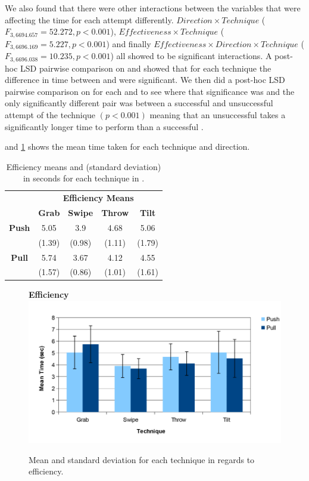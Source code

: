 We also found that there were other interactions between the variables that were affecting the time for each attempt differently. 
$Direction \times Technique$  ($F_{3,6694.657} = 52.272, p < 0.001$), $Effectiveness \times Technique$  ($F_{3,6696.169} = 5.227, p < 0.001$) and finally $Effectiveness \times Direction \times Technique$  ($F_{3,6696.038} = 10.235, p < 0.001$) all showed to be significant interactions. 
A post-hoc LSD pairwise comparison on \direction and \technique showed that for each technique the difference in time between \push and \pull were significant.
We then did a post-hoc LSD pairwise comparison on \effectiveness for each \technique and \direction to see where that significance was and the only significantly different pair was between a successful and unsuccessful attempt of the \grab \pull technique $(p < 0.001)$ meaning that an unsuccessful \grab \pull takes a significantly longer time to perform than a successful \grab \pull.

 and \cref{fig:efficiencyGraph} shows the mean time taken for each technique and direction.

\begin{table}[H]
	\centering
	\def\arraystretch{1}
		\begin{tabular}{c c c c c}
			& \multicolumn{4}{c}{\textbf{Efficiency Means}} \B \\
			\cline{2-5}
			& \textbf{Grab} & \textbf{Swipe} & \textbf{Throw} & \textbf{Tilt} \T\B \\ \hline
			\textbf{Push} & 5.05 & 3.9 & 4.68 & 5.06 \T \\ 
			& (1.39) & (0.98) & (1.11) & (1.79) \B \\ \hline
			\textbf{Pull} & 5.74 & 3.67 & 4.12 & 4.55 \T \\ 
			& (1.57) & (0.86) & (1.01) & (1.61) \B \\ \hline
		\end{tabular}
	\caption{Efficiency means and (standard deviation) in seconds for each technique in \target.}
	\label{tab:efficiency}
\end{table}

\begin{figure}[H]{
	\centering
	\textbf{Efficiency}\\[4pt]
	\includegraphics[width = 1\columnwidth ]{images/time_graph.pdf}} 
	\caption{
		Mean and standard deviation for each technique in regards to efficiency.
	}
	\label{fig:efficiencyGraph}
\end{figure}

